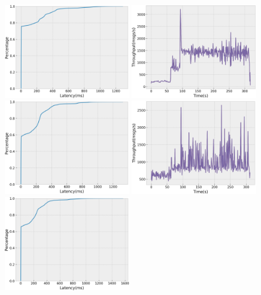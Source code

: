 \begin{figure}[H]
  \centering
  \includegraphics[width=0.49\textwidth,height=\textheight,keepaspectratio]{img/local50_lat.png}
  \includegraphics[width=0.49\textwidth,height=\textheight,keepaspectratio]{img/local50_tp.png}
  \includegraphics[width=0.49\textwidth,height=\textheight,keepaspectratio]{img/local10_lat.png}
  \includegraphics[width=0.49\textwidth,height=\textheight,keepaspectratio]{img/local10_tp.png}
  \includegraphics[width=0.49\textwidth,height=\textheight,keepaspectratio]{img/local5_lat.png}

\end{figure}
